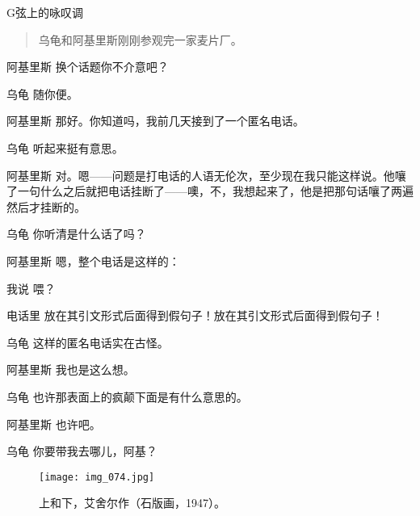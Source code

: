
\begin{dialog}{G弦上的咏叹调}

\begin{quote}
乌龟和阿基里斯刚刚参观完一家麦片厂。
\end{quote}

\begin{dialogue}

\item[阿基里斯]换个话题你不介意吧？

\item[乌龟]随你便。

\item[阿基里斯]那好。你知道吗，我前几天接到了一个匿名电话。

\item[乌龟]听起来挺有意思。

\item[阿基里斯]对。嗯——问题是打电话的人语无伦次，至少现在我只能这样说。他嚷了一句什么之后就把电话挂断了——噢，不，我想起来了，他是把那句话嚷了两遍然后才挂断的。

\item[乌龟]你听清是什么话了吗？

\item[阿基里斯]嗯，整个电话是这样的：

\begin{dialogue}[labelwidth=3\ccwd,leftmargin=4\ccwd]
  \item[我说]喂？
  \item[电话里]放在其引文形式后面得到假句子！放在其引文形式后面得到假句子！
  
\end{dialogue}

\item[乌龟]这样的匿名电话实在古怪。

\item[阿基里斯]我也是这么想。

\item[乌龟]也许那表面上的疯颠下面是有什么意思的。

\item[阿基里斯]也许吧。


\item[乌龟]你要带我去哪儿，阿基？

\begin{figure}
\texttt{[image: img\_074.jpg]}
\caption[上和下，艾舍尔作。]
  {上和下，艾舍尔作（石版画，1947）。}
\end{figure}


\end{dialogue}
\end{dialog}
